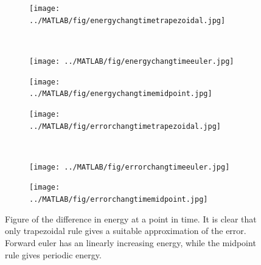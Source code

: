 \begin{figure}[H]
        \centering
        \begin{subfigure}[b]{0.30\textwidth}
                \texttt{[image: ../MATLAB/fig/energychangtimetrapezoidal.jpg]}
                \caption{  }
                \label{fig:energychangtimetrapezoidal}
        \end{subfigure}%
        ~
        \begin{subfigure}[b]{0.30\textwidth}
                \texttt{[image: ../MATLAB/fig/energychangtimeeuler.jpg]}
                \caption{  }
                \label{fig:energychangtimeeuler}
        \end{subfigure}
        \begin{subfigure}[b]{0.30\textwidth}
                \texttt{[image: ../MATLAB/fig/energychangtimemidpoint.jpg]}
                \caption{  }
                \label{fig:energychangtimemidpoint}
        \end{subfigure}
        
        \begin{subfigure}[b]{0.30\textwidth}
                \texttt{[image: ../MATLAB/fig/errorchangtimetrapezoidal.jpg]}
                \caption{  }
                \label{fig:errorchangtimetrapezoidal}
        \end{subfigure}%
        ~
        \begin{subfigure}[b]{0.30\textwidth}
                \texttt{[image: ../MATLAB/fig/errorchangtimeeuler.jpg]}
                \caption{  }
                \label{fig:errorchangtimeeuler}
        \end{subfigure}
        \begin{subfigure}[b]{0.30\textwidth}
                \texttt{[image: ../MATLAB/fig/errorchangtimemidpoint.jpg]}
                \caption{  }
                \label{fig:errorchangtimemidpoint}
        \end{subfigure}
        \caption{Figure of the difference in energy at a point in time. It is clear that only trapezoidal rule gives a suitable approximation of the error. Forward euler has an linearly increasing energy, while the midpoint rule gives periodic energy.}
        \label{fig:errorchang}
\end{figure}